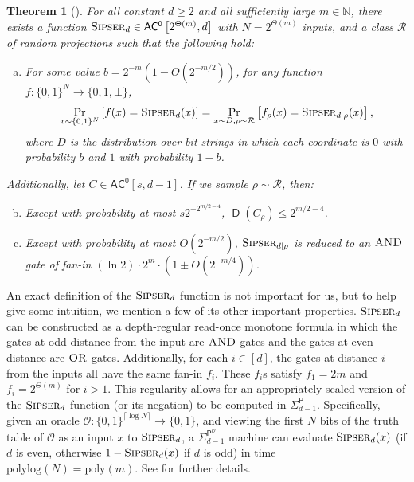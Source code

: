 \documentclass[11pt]{article}%
\newtheorem{theorem}{Theorem}
\newcommand{\Naturals}{\mathbb{N}}
\newcommand{\poly}{\mathrm{poly}}
\newcommand{\polylog}{\mathrm{polylog}}
\newcommand{\Sipser}{\normalfont\textsc{Sipser}}
\newcommand{\AND}{\normalfont\textsc{AND}} %
\newcommand{\OR}{\normalfont\textsc{OR}}
\DeclareMathOperator{\D}{\mathsf{D}}
\begin{document}
\begin{theorem}[{\cite[Proof of Theorem 10.1]{HRST17}}]
\label{thm:hrst}
For all constant $d \ge 2$ and all sufficiently large $m \in \Naturals$, there exists a function $\Sipser_d \in \mathsf{AC^0}\left[2^{\Theta(m)}, d\right]$ with $N = 2^{\Theta(m)}$ inputs, and a class $\mathcal{R}$ of random projections such that the following hold:
\begin{enumerate}[(a)]
\item For some value $b = 2^{-m}\left(1 - O\left(2^{-m/2}\right)\right)$, for any function $f: \{0,1\}^N \to \{0,1,\bot\}$,
\[
\Pr_{x \sim \{0,1\}^N}\left[f(x) = \Sipser_d(x)\right] = \Pr_{x \sim D, \rho \sim \mathcal{R}}\left[f_\rho(x) = \Sipser_{d|\rho} (x)\right],
\]
where $D$ is the distribution over bit strings in which each coordinate is $0$ with probability $b$ and $1$ with probability $1 - b$.
\end{enumerate}
Additionally, let $C \in \mathsf{AC^0}[s, d - 1]$. If we sample $\rho \sim \mathcal{R}$, then:
\begin{enumerate}[(a)]
\setcounter{enumi}{1}
\item Except with probability at most $s2^{-2^{m/2 - 4}}$, $\D\left(C_\rho\right) \le 2^{m/2 - 4}$.
\item Except with probability at most $O\left(2^{-m/2}\right)$, $\Sipser_{d|\rho}$ is reduced to an $\AND$ gate of fan-in $(\ln 2) \cdot 2^m \cdot \left(1 \pm O\left(2^{-m/4}\right)\right)$.
\end{enumerate}
\end{theorem}

An exact definition of the $\Sipser_d$ function is not important for us, but to help give some intuition, we mention a few of its other important properties. $\Sipser_d$ can be constructed as a depth-regular read-once monotone formula in which the gates at odd distance from the input are $\AND$ gates and the gates at even distance are $\OR$ gates. Additionally, for each $i \in [d]$, the gates at distance $i$ from the inputs all have the same fan-in $f_i$. These $f_i$s satisfy $f_1 = 2m$ and $f_i = 2^{\Theta(m)}$ for $i > 1$. This regularity allows for an appropriately scaled version of the $\Sipser_d$ function (or its negation) to be computed in $\mathsf{\Sigma}_{d-1}^\mathsf{P}$. Specifically, given an oracle $\mathcal{O}: \{0,1\}^{\lceil \log N \rceil} \to \{0,1\}$, and viewing the first $N$ bits of the truth table of $\mathcal{O}$ as an input $x$ to $\Sipser_d$, a  $\mathsf{\Sigma}_{d-1}^{\mathsf{P}^\mathcal{O}}$ machine can evaluate $\Sipser_d(x)$ (if $d$ is even, otherwise $1 - \Sipser_d(x)$ if $d$ is odd) in time $\polylog(N) = \poly(m)$. See \cite{RST15,HRST17} for further details.
\end{document}
